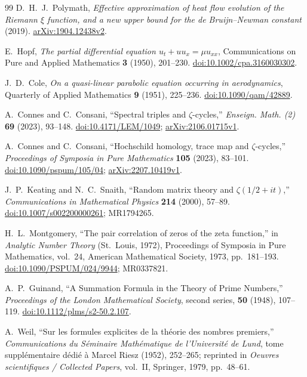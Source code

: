 \begin{thebibliography}{99}
D.~H.~J.~Polymath,
\emph{Effective approximation of heat flow evolution of the Riemann $\xi$
function, and a new upper bound for the de Bruijn--Newman constant} (2019).
\href{https://arxiv.org/abs/1904.12438}{arXiv:1904.12438v2}.

E.~Hopf,
\emph{The partial differential equation $u_t+uu_x=\mu u_{xx}$},
Communications on Pure and Applied Mathematics \textbf{3}
(1950), 201--230.
\href{https://doi.org/10.1002/cpa.3160030302}{doi:10.1002/cpa.3160030302}.

J.~D.~Cole,
\emph{On a quasi-linear parabolic equation occurring in aerodynamics},
Quarterly of Applied Mathematics \textbf{9} (1951), 225--236.
\href{https://doi.org/10.1090/qam/42889}{doi:10.1090/qam/42889}.

A.~Connes and C.~Consani,
``Spectral triples and $\zeta$-cycles,''
\emph{Enseign. Math. (2)} \textbf{69} (2023), 93--148.
\href{https://doi.org/10.4171/LEM/1049}{doi:10.4171/LEM/1049};
\href{https://arxiv.org/abs/2106.01715}{arXiv:2106.01715v1}.

A.~Connes and C.~Consani,
``Hochschild homology, trace map and $\zeta$-cycles,''
\emph{Proceedings of Symposia in Pure Mathematics} \textbf{105} (2023),
83--101.
\href{https://doi.org/10.1090/pspum/105/04}{doi:10.1090/pspum/105/04};
\href{https://arxiv.org/abs/2207.10419}{arXiv:2207.10419v1}.

J.~P.~Keating and N.~C.~Snaith,
``Random matrix theory and $\zeta(1/2+it)$,''
\emph{Communications in Mathematical Physics} \textbf{214} (2000), 57--89.
\href{https://doi.org/10.1007/s002200000261}{doi:10.1007/s002200000261};
MR1794265.

H.~L.~Montgomery,
``The pair correlation of zeros of the zeta function,''
in \emph{Analytic Number Theory} (St.~Louis, 1972),
Proceedings of Symposia in Pure Mathematics, vol.~24,
American Mathematical Society, 1973, pp.~181--193.
\href{https://doi.org/10.1090/PSPUM/024/9944}{doi:10.1090/PSPUM/024/9944};
MR0337821.

A.~P.~Guinand,
``A Summation Formula in the Theory of Prime Numbers,''
\emph{Proceedings of the London Mathematical Society}, second series,
\textbf{50} (1948), 107--119.
\href{https://doi.org/10.1112/plms/s2-50.2.107}{doi:10.1112/plms/s2-50.2.107}.

A.~Weil,
``Sur les formules explicites de la th\'eorie des nombres premiers,''
\emph{Communications du S\'eminaire Math\'ematique de l'Universit\'e de Lund},
tome suppl\'ementaire d\'edi\'e \`a Marcel Riesz (1952), 252--265;
reprinted in \emph{Oeuvres scientifiques / Collected Papers}, vol.~II,
Springer, 1979, pp.~48--61.


\end{thebibliography}
